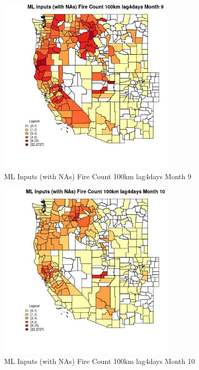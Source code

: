 \begin{figure} 
\centering  
\includegraphics[width=0.77\textwidth]{Code_Outputs/Report_ML_input_PM25_Step4_part_f_de_duplicated_aves_prioritize_24hr_obswNAs_CountyFire_Count_100km_lag4daysmedianMonth9.jpg} 
\caption{\label{fig:Report_ML_input_PM25_Step4_part_f_de_duplicated_aves_prioritize_24hr_obswNAsCountyFire_Count_100km_lag4daysmedianMonth9}ML Inputs (with NAs) Fire Count 100km lag4days Month 9} 
\end{figure} 
 

\begin{figure} 
\centering  
\includegraphics[width=0.77\textwidth]{Code_Outputs/Report_ML_input_PM25_Step4_part_f_de_duplicated_aves_prioritize_24hr_obswNAs_CountyFire_Count_100km_lag4daysmedianMonth10.jpg} 
\caption{\label{fig:Report_ML_input_PM25_Step4_part_f_de_duplicated_aves_prioritize_24hr_obswNAsCountyFire_Count_100km_lag4daysmedianMonth10}ML Inputs (with NAs) Fire Count 100km lag4days Month 10} 
\end{figure} 
 

